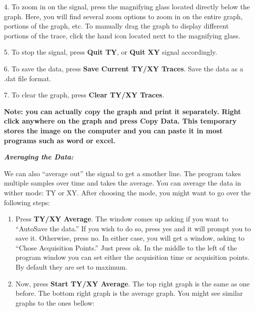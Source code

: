 \documentclass{../lab}
\begin{document}
4. To zoom in on the signal, press the magnifying glass located directly below the graph. Here, you will find several zoom options to zoom in on the entire graph, portions of the graph, etc. To manually drag the graph to display different portions of the trace, click the hand icon located next to the magnifying glass.

5. To stop the signal, press \textbf{Quit TY}, or \textbf{Quit XY} signal accordingly.

6. To save the data, press \textbf{Save Current TY/XY Traces}. Save the data as a .dat file format.

7. To clear the graph, press \textbf{Clear TY/XY Traces}.

\textbf{Note: you can actually copy the graph and print it separately. Right click anywhere on the graph and press Copy Data. This temporary stores the image on the computer and you can paste it in most programs such as word or excel.}

\emph{\textbf{Averaging the Data:}}

We can also ``average out'' the signal to get a smother line. The program takes multiple samples over time and takes the average. You can average the data in wither mode: TY or XY. After choosing the mode, you might want to go over the following steps:

\begin{enumerate}
    \item Press \textbf{TY/XY Average}. The window comes up asking if you want to ``AutoSave the data.'' If you wish to do so, press yes and it will prompt you to save it. Otherwise, press no. In either case, you will get a window, asking to ``Chose Acquisition Points.'' Just press ok. In the middle to the left of the program window you can set either the acquisition time or acquisition points. By default they are set to maximum.

    \item Now, press \textbf{Start TY/XY Average}. The top right graph is the same as one before. The bottom right graph is the average graph. You might see similar graphs to the ones bellow:

\end{enumerate}
\end{document}
